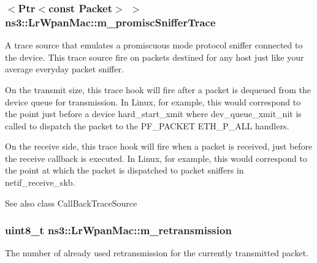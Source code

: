 \subsubsection[{\texorpdfstring{m\+\_\+promisc\+Sniffer\+Trace}{m_promiscSnifferTrace}}]{$<${\bf Ptr}$<$const {\bf Packet}$>$ $>$ ns3\+::\+Lr\+Wpan\+Mac\+::m\+\_\+promisc\+Sniffer\+Trace\hspace{0.3cm}{\ttfamily [private]}}\hypertarget{classns3_1_1LrWpanMac_a39b7fdffc860b187b9f316d78127d51f}{}\label{classns3_1_1LrWpanMac_a39b7fdffc860b187b9f316d78127d51f}
A trace source that emulates a promiscuous mode protocol sniffer connected to the device. This trace source fire on packets destined for any host just like your average everyday packet sniffer.

On the transmit size, this trace hook will fire after a packet is dequeued from the device queue for transmission. In Linux, for example, this would correspond to the point just before a device hard\+\_\+start\+\_\+xmit where dev\+\_\+queue\+\_\+xmit\+\_\+nit is called to dispatch the packet to the P\+F\+\_\+\+P\+A\+C\+K\+ET E\+T\+H\+\_\+\+P\+\_\+\+A\+LL handlers.

On the receive side, this trace hook will fire when a packet is received, just before the receive callback is executed. In Linux, for example, this would correspond to the point at which the packet is dispatched to packet sniffers in netif\+\_\+receive\+\_\+skb.

\begin{DoxySeeAlso}{See also}
class Call\+Back\+Trace\+Source 
\end{DoxySeeAlso}
\subsubsection[{\texorpdfstring{m\+\_\+retransmission}{m_retransmission}}]{\setlength{\rightskip}{0pt plus 5cm}uint8\+\_\+t ns3\+::\+Lr\+Wpan\+Mac\+::m\+\_\+retransmission\hspace{0.3cm}{\ttfamily [private]}}\hypertarget{classns3_1_1LrWpanMac_afa6dceab5f0fec699c907ea8c61ffa39}{}\label{classns3_1_1LrWpanMac_afa6dceab5f0fec699c907ea8c61ffa39}
The number of already used retransmission for the currently transmitted packet. 
